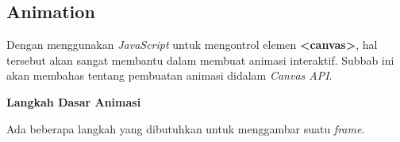 %		
%	
%		


\subsection{Animation}
Dengan menggunakan \textit{JavaScript} untuk mengontrol elemen \textbf{<canvas>}, hal tersebut akan sangat membantu dalam membuat animasi interaktif. Subbab ini akan membahas tentang pembuatan animasi didalam \textit{Canvas API}.

\textbf{Langkah Dasar Animasi}

Ada beberapa langkah yang dibutuhkan untuk menggambar suatu \textit{frame}.

